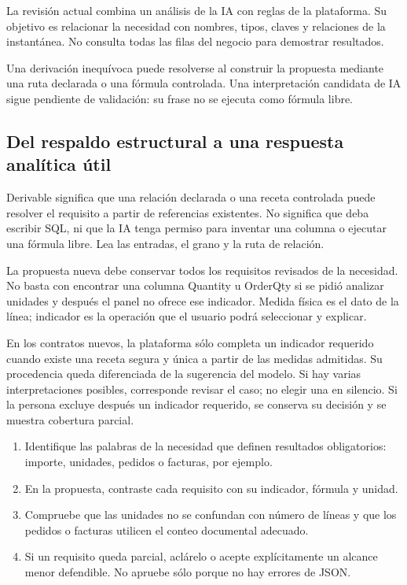 La revisión actual combina un análisis de la IA con reglas de la plataforma. Su objetivo es relacionar la necesidad con nombres, tipos, claves y relaciones de la instantánea. No consulta todas las filas del negocio para demostrar resultados.

Una derivación inequívoca puede resolverse al construir la propuesta mediante una ruta declarada o una fórmula controlada. Una interpretación candidata de IA sigue pendiente de validación: su frase no se ejecuta como fórmula libre.

\subsection{Del respaldo estructural a una respuesta analítica útil}
Derivable significa que una relación declarada o una receta controlada puede resolver el requisito a partir de referencias existentes. No significa que deba escribir SQL, ni que la IA tenga permiso para inventar una columna o ejecutar una fórmula libre. Lea las entradas, el grano y la ruta de relación.

La propuesta nueva debe conservar todos los requisitos revisados de la necesidad. No basta con encontrar una columna Quantity u OrderQty si se pidió analizar unidades y después el panel no ofrece ese indicador. Medida física es el dato de la línea; indicador es la operación que el usuario podrá seleccionar y explicar.

En los contratos nuevos, la plataforma sólo completa un indicador requerido cuando existe una receta segura y única a partir de las medidas admitidas. Su procedencia queda diferenciada de la sugerencia del modelo. Si hay varias interpretaciones posibles, corresponde revisar el caso; no elegir una en silencio. Si la persona excluye después un indicador requerido, se conserva su decisión y se muestra cobertura parcial.

\begin{enumerate}
\item Identifique las palabras de la necesidad que definen resultados obligatorios: importe, unidades, pedidos o facturas, por ejemplo.
\item En la propuesta, contraste cada requisito con su indicador, fórmula y unidad.
\item Compruebe que las unidades no se confundan con número de líneas y que los pedidos o facturas utilicen el conteo documental adecuado.
\item Si un requisito queda parcial, aclárelo o acepte explícitamente un alcance menor defendible. No apruebe sólo porque no hay errores de JSON.
\end{enumerate}

